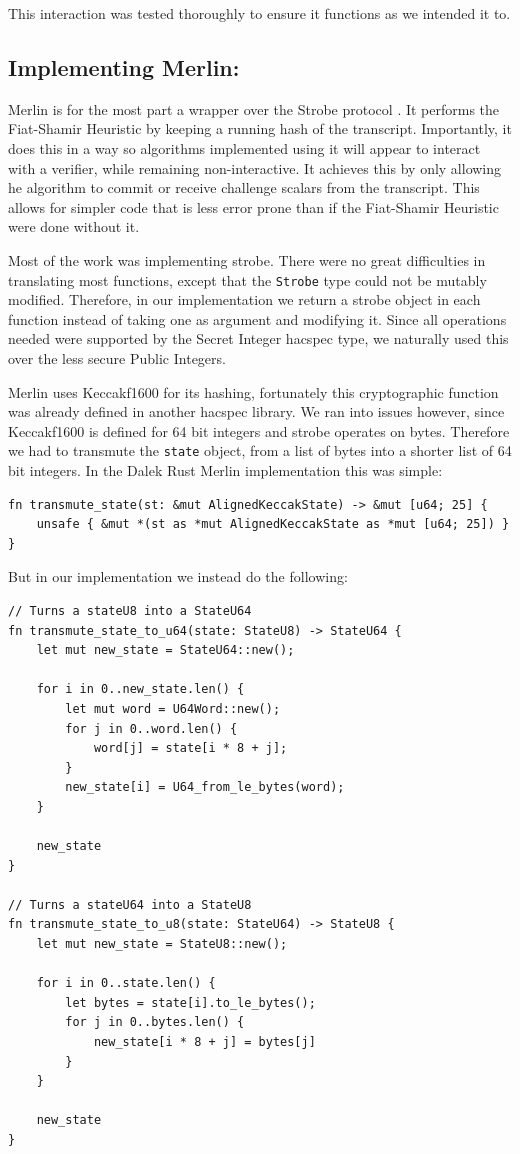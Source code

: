 \documentclass{article}
\begin{document}
This interaction was tested thoroughly to ensure it functions as we intended it to. 

\subsection{Implementing Merlin:} \label{implementing-merlin}

Merlin \cite{merlin} is for the most part a wrapper over the Strobe
protocol \cite{strobe}. It performs the Fiat-Shamir Heuristic by
keeping a running hash of the transcript. Importantly, it does this
in a way so algorithms implemented using it will appear to interact
with a verifier, while remaining non-interactive. It achieves this
by only allowing he algorithm to commit or receive challenge scalars
from the transcript. This allows for simpler code that is less error
prone than if the Fiat-Shamir Heuristic were done without it.

Most of the work was implementing strobe. There were no great
difficulties in translating most functions, except that the
\texttt{Strobe} type could not be mutably modified. Therefore, in our
implementation we return a strobe object in each function instead
of taking one as argument and modifying it. Since all operations needed
were supported by the Secret Integer hacspec type, we naturally used
this over the less secure Public Integers.

Merlin uses Keccakf1600 for its hashing, fortunately this cryptographic
function was already defined in another hacspec library. We ran into
issues however, since Keccakf1600 is defined for 64 bit integers
and strobe operates on bytes. Therefore we had to transmute the
\texttt{state} object, from a list of bytes into a shorter list of 64
bit integers. In the Dalek Rust Merlin implementation this was simple:

\begin{lstlisting}
fn transmute_state(st: &mut AlignedKeccakState) -> &mut [u64; 25] {
    unsafe { &mut *(st as *mut AlignedKeccakState as *mut [u64; 25]) }
}
\end{lstlisting}

But in our implementation we instead do the following: 

\begin{lstlisting}
// Turns a stateU8 into a StateU64
fn transmute_state_to_u64(state: StateU8) -> StateU64 {
    let mut new_state = StateU64::new();

    for i in 0..new_state.len() {
        let mut word = U64Word::new();
        for j in 0..word.len() {
            word[j] = state[i * 8 + j];
        }
        new_state[i] = U64_from_le_bytes(word);
    }

    new_state
}

// Turns a stateU64 into a StateU8
fn transmute_state_to_u8(state: StateU64) -> StateU8 {
    let mut new_state = StateU8::new();

    for i in 0..state.len() {
        let bytes = state[i].to_le_bytes();
        for j in 0..bytes.len() {
            new_state[i * 8 + j] = bytes[j]
        }
    }

    new_state
}
\end{lstlisting}
\end{document}
